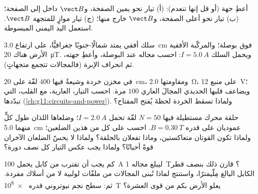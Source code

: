\begin{exercise}[$\star\star$]\label{exo:g11:magnetic-fields:11}
أعطِ جهة  (أو قل إنها تنعدم):
(أ) تيار نحو يمين الصفحة، و$\vect B$ داخل إلى الصفحة؛
(ب) تيار نحو أعلى الصفحة، و$\vect B$ خارج منها؛
(ج) تيار موازٍ للمتجهة $\vect B$. استعمل اليد اليمنى المبسوطة.
\end{exercise}

\begin{exercise}[$\star\star\star$]\label{exo:g11:magnetic-fields:12}
سلك أفقي يمتد شمالًا-جنوبًا جغرافيًّا، على ارتفاع \qty{3.0}{cm} فوق
بوصلة؛ والمركّبة الأفقية  الأرض هناك \qty{20}{\micro T}.
ويحمل السلك $I = \qty{5.0}{A}$: احسب مجاله عند البوصلة،
وأعطِ جهته، ثم انحراف الإبرة (فالمجالات تتجمع متجهاتٍ).
\end{exercise}

\begin{exercise}[$\star\star\star$]\label{exo:g11:magnetic-fields:13}
 في مخزن خردة وشيعةٌ فيها $400$ لفّة على \qty{20}{cm}،
ومقاومتها \qty{2.0}{\ohm}، على منبع \qty{12}{V}؛ ويضاعف قلبها الحديدي
المجالَ العاري $100$ مرة. احسب التيار،  
العارية،  مع القلب،  التي تبدّدها 
(\cref{ch:g11:circuits-and-power}). ولماذا تسقط الخردة
لحظةَ يُفتح المفتاح؟
\end{exercise}

\begin{exercise}[$\star\star\star$]\label{exo:g11:magnetic-fields:14}
حلقة محرك مستطيلة فيها $N = 50$ لفّة تحمل
$I = \qty{2.0}{A}$؛ وضلعاها اللذان طول كلٍّ منهما \qty{5.0}{cm}
عموديان على  قدره $B = \qty{0.30}{T}$. احسب  على كل
من هذين الضلعين؛ ولماذا تكون القوتان متعاكستين، وماذا تفعلان
بالحلقة؟ ولماذا لا يحسّ الضلعان الآخران قوةً أحيانًا؟ ولماذا يجب
عكس التيار كل نصف دورة؟
\end{exercise}

\begin{exercise}[$\star\star\star$]\label{exo:g11:magnetic-fields:15}
كم يجب أن تقترب من كابل يحمل \qty{100}{A} ليبلغ
مجاله \qty{1}{T}؟ قارن ذلك بنصف قطر الكابل البالغ مِلّيمترًا،
واستنتج لماذا تُبنى المجالات   من
ملفّات لولبية لا من أسلاك مفردة. ثم:  سطح نجم نيوتروني قدره
\qty{e8}{T} يعلو  الأرض بكم  من قوى العشرة؟
\end{exercise}

